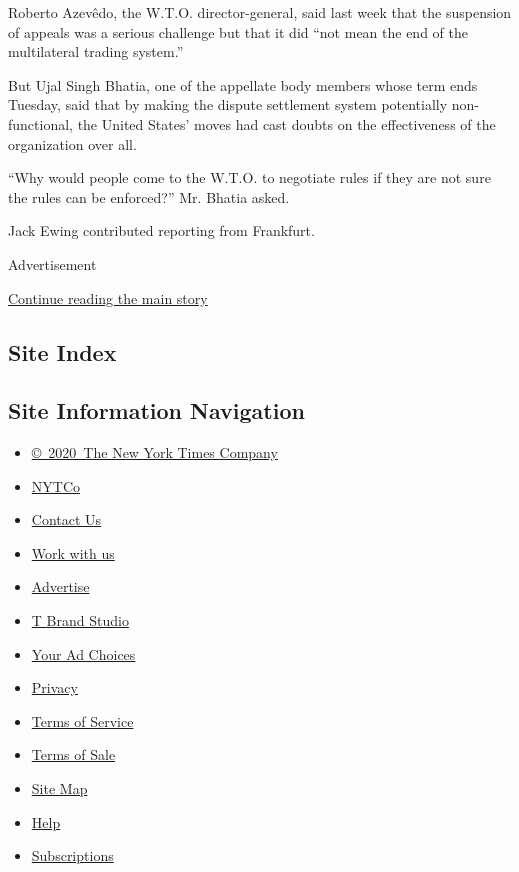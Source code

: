 Roberto Azevêdo, the W.T.O. director-general, said last week that the
suspension of appeals was a serious challenge but that it did ``not mean
the end of the multilateral trading system.''

But Ujal Singh Bhatia, one of the appellate body members whose term ends
Tuesday, said that by making the dispute settlement system potentially
non-functional, the United States' moves had cast doubts on the
effectiveness of the organization over all.

``Why would people come to the W.T.O. to negotiate rules if they are not
sure the rules can be enforced?'' Mr. Bhatia asked.

Jack Ewing contributed reporting from Frankfurt.

Advertisement

\protect\hyperlink{after-bottom}{Continue reading the main story}

\hypertarget{site-index}{%
\subsection{Site Index}\label{site-index}}

\hypertarget{site-information-navigation}{%
\subsection{Site Information
Navigation}\label{site-information-navigation}}

\begin{itemize}
\tightlist
\item
  \href{https://help.nytimes.com/hc/en-us/articles/115014792127-Copyright-notice}{©~2020~The
  New York Times Company}
\end{itemize}

\begin{itemize}
\tightlist
\item
  \href{https://www.nytco.com/}{NYTCo}
\item
  \href{https://help.nytimes.com/hc/en-us/articles/115015385887-Contact-Us}{Contact
  Us}
\item
  \href{https://www.nytco.com/careers/}{Work with us}
\item
  \href{https://nytmediakit.com/}{Advertise}
\item
  \href{http://www.tbrandstudio.com/}{T Brand Studio}
\item
  \href{https://www.nytimes.com/privacy/cookie-policy\#how-do-i-manage-trackers}{Your
  Ad Choices}
\item
  \href{https://www.nytimes.com/privacy}{Privacy}
\item
  \href{https://help.nytimes.com/hc/en-us/articles/115014893428-Terms-of-service}{Terms
  of Service}
\item
  \href{https://help.nytimes.com/hc/en-us/articles/115014893968-Terms-of-sale}{Terms
  of Sale}
\item
  \href{https://spiderbites.nytimes.com}{Site Map}
\item
  \href{https://help.nytimes.com/hc/en-us}{Help}
\item
  \href{https://www.nytimes.com/subscription?campaignId=37WXW}{Subscriptions}
\end{itemize}
